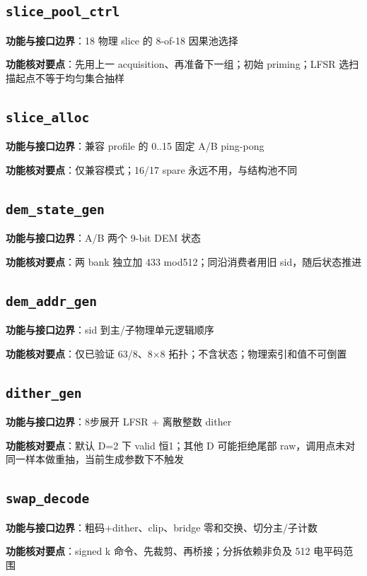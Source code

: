 \documentclass[UTF8,fontset=fandol,10pt,a4paper,openany]{ctexrep}
\newcommand{\code}[1]{\nolinkurl{#1}}
\begin{document}
\subsection*{\code{slice_pool_ctrl}}
\noindent\textbf{功能与接口边界}：18 物理 slice 的 8-of-18 因果池选择\par
\noindent\textbf{功能核对要点}：先用上一 acquisition、再准备下一组；初始 priming；LFSR 选扫描起点不等于均匀集合抽样\par
\subsection*{\code{slice_alloc}}
\noindent\textbf{功能与接口边界}：兼容 profile 的 0..15 固定 A/B ping-pong\par
\noindent\textbf{功能核对要点}：仅兼容模式；16/17 spare 永远不用，与结构池不同\par
\subsection*{\code{dem_state_gen}}
\noindent\textbf{功能与接口边界}：A/B 两个 9-bit DEM 状态\par
\noindent\textbf{功能核对要点}：两 bank 独立加 433 mod512；同沿消费者用旧 sid，随后状态推进\par
\subsection*{\code{dem_addr_gen}}
\noindent\textbf{功能与接口边界}：sid 到主/子物理单元逻辑顺序\par
\noindent\textbf{功能核对要点}：仅已验证 63/8、8\ensuremath{\times}8 拓扑；不含状态；物理索引和值不可倒置\par
\subsection*{\code{dither_gen}}
\noindent\textbf{功能与接口边界}：8步展开 LFSR + 离散整数 dither\par
\noindent\textbf{功能核对要点}：默认 D=2 下 valid 恒1；其他 D 可能拒绝尾部 raw，调用点未对同一样本做重抽，当前生成参数下不触发\par
\subsection*{\code{swap_decode}}
\noindent\textbf{功能与接口边界}：粗码+dither、clip、bridge 零和交换、切分主/子计数\par
\noindent\textbf{功能核对要点}：signed k 命令、先裁剪、再桥接；分拆依赖非负及 512 电平码范围\par
\end{document}

